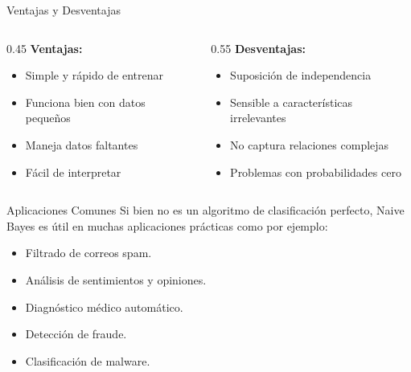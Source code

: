 \documentclass{beamer}
\begin{document}
\begin{frame}{Ventajas y Desventajas}
    \begin{columns}
        \begin{column}{0.45\textwidth}
            \textbf{Ventajas:}
            \begin{itemize}
                \item[{\makebox[1em][c]{\textcolor{primary}{\faCheck}}}] Simple y rápido de entrenar
                \item[{\makebox[1em][c]{\textcolor{primary}{\faCheck}}}] Funciona bien con datos pequeños
                \item[{\makebox[1em][c]{\textcolor{primary}{\faCheck}}}] Maneja datos faltantes
                \item[{\makebox[1em][c]{\textcolor{primary}{\faCheck}}}] Fácil de interpretar
            \end{itemize}
        \end{column}
        \begin{column}{0.55\textwidth}
            \textbf{Desventajas:}
            \begin{itemize}
                \item[{\makebox[1em][c]{\textcolor{accent}{\faTimes}}}] Suposición de independencia
                \item[{\makebox[1em][c]{\textcolor{accent}{\faTimes}}}] Sensible a características irrelevantes
                \item[{\makebox[1em][c]{\textcolor{accent}{\faTimes}}}] No captura relaciones complejas
                \item[{\makebox[1em][c]{\textcolor{accent}{\faTimes}}}] Problemas con probabilidades cero
            \end{itemize}
        \end{column}
    \end{columns}
\end{frame}

\begin{frame}{Aplicaciones Comunes}
    Si bien no es un algoritmo de clasificación perfecto, Naive Bayes es útil en muchas aplicaciones prácticas como por ejemplo:
    \begin{itemize}
        \item Filtrado de correos spam.
        \item Análisis de sentimientos y opiniones.
        \item Diagnóstico médico automático.
        \item Detección de fraude.
        \item Clasificación de malware.
    \end{itemize}
\end{frame}
\end{document}
